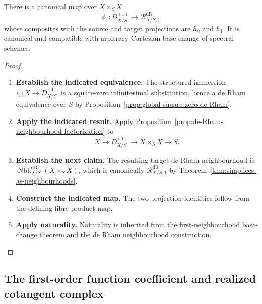 \begin{proposition}
\label{prop:first-neighbourhood-relation}
There is a canonical map over \(X\times_SX\)
\[
  \phi_1:
  D^{(1)}_{X/S}
  \longrightarrow
  \mathcal R^{\mathrm{dR}}_{X/S,1}
\]
whose composites with the source and target projections are \(h_0\) and
\(h_1\). It is canonical and compatible with arbitrary Cartesian base change of
spectral schemes.
\end{proposition}

\begin{proof}
\leavevmode
\begin{enumerate}[label=\textup{(\arabic*)}]
    \item \textbf{Establish the indicated equivalence.}
    The structured immersion
    \(i_1:X\to D^{(1)}_{X/S}\) is a square-zero infinitesimal substitution, hence a
    de Rham equivalence over \(S\) by
    Proposition~\ref{prop:global-square-zero-de-Rham}.
    \item \textbf{Apply the indicated result.}
    Apply
    Proposition~\ref{prop:de-Rham-neighbourhood-factorization} to
    \[
    X\longrightarrow D^{(1)}_{X/S}
    \longrightarrow X\times_SX\longrightarrow S.
    \]
    \item \textbf{Establish the next claim.}
    The resulting target de Rham neighbourhood is
    \(\operatorname{Nbh}^{\mathrm{dR}}_{X/S}(X\times_SX)\), which is canonically
    \(\mathcal R^{\mathrm{dR}}_{X/S,1}\) by
    Theorem~\ref{thm:simplices-as-neighbourhoods}.
    \item \textbf{Construct the indicated map.}
    The two projection identities follow
    from the defining fibre-product map.
    \item \textbf{Apply naturality.}
    Naturality is inherited from
    the first-neighbourhood base-change theorem and the de Rham neighbourhood construction.
\end{enumerate}
\end{proof}

\subsection{The first-order function coefficient and realized cotangent complex}

